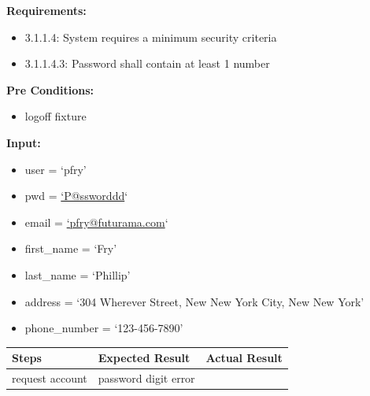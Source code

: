 \documentclass[letterpaper,10pt,english]{sphinxmanual}
\begin{document}
\begin{fulllineitems}
\label{STD/test_password:test_password.test_password_digit}
\textbf{Requirements:}
\begin{itemize}
\item {} 
3.1.1.4: System requires a minimum security criteria

\item {} 
3.1.1.4.3: Password shall contain at least 1 number

\end{itemize}

\textbf{Pre Conditions:}
\begin{itemize}
\item {} 
logoff fixture

\end{itemize}

\textbf{Input:}
\begin{itemize}
\item {} 
user = `pfry'

\item {} 
pwd = \href{mailto:'P@ssworddd}{`P@ssworddd}`

\item {} 
email = \href{mailto:'pfry@futurama.com}{`pfry@futurama.com}`

\item {} 
first\_name = `Fry'

\item {} 
last\_name = `Phillip'

\item {} 
address = `304 Wherever Street, New New York City, New New York'

\item {} 
phone\_number = `123-456-7890'

\end{itemize}

\begin{tabulary}{\linewidth}{|L|L|L|}
\hline
\textsf{\relax 
Steps
} & \textsf{\relax 
Expected Result
} & \textsf{\relax 
Actual Result
}\\
\hline
request account
 & 
password digit error
 & \\
\hline\end{tabulary}


\end{fulllineitems}

\end{document}
